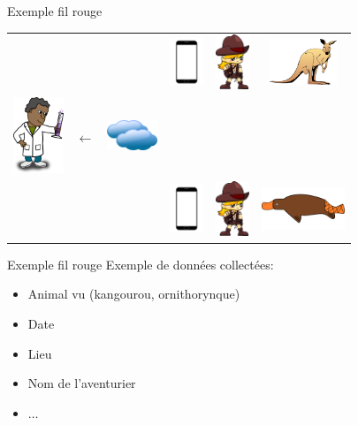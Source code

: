 \documentclass{beamer}
\begin{document}
\begin{frame}{Exemple fil rouge}
\begin{tabular}{lcccrc}
&	& & 
\includegraphics[width=1cm]{phone.png} 
& \includegraphics[width=1cm]{adventurer.png} 
& \includegraphics[width=2cm]{kangourou.png} \\
\includegraphics[width=1.5cm]{researcher.png} & $\leftarrow$
& \includegraphics[width = 1.5cm]{cloud.png}
& & &   \\
& & & 
\includegraphics[width=1cm]{phone.png} 
& \includegraphics[width=1cm]{adventurer.png} 
& \includegraphics[width=2.5cm]{orni.png}
\end{tabular}
\end{frame}

\begin{frame}{Exemple fil rouge}
Exemple de données collectées:
\begin{itemize}
\item Animal vu (kangourou, ornithorynque)
\item Date
\item Lieu
\item Nom de l'aventurier
\item $\dots$
\end{itemize}
\end{frame}
\end{document}
